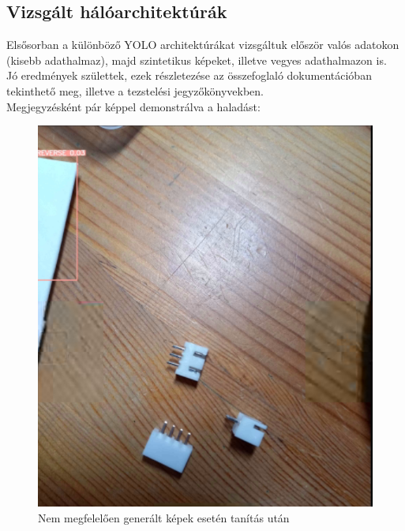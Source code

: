 \documentclass{article}
\begin{document}
\subsection{Vizsgált hálóarchitektúrák}
Elsősorban a különböző YOLO architektúrákat vizsgáltuk először valós adatokon (kisebb adathalmaz), 
majd szintetikus képeket, illetve vegyes adathalmazon is.\\
Jó eredmények születtek, ezek részletezése az összefoglaló dokumentációban 
tekinthető meg, illetve a tezstelési jegyzőkönyvekben.\\[5pt]
Megjegyzésként pár képpel demonstrálva a haladást:
\begin{figure}[h]
  \centering
  \includegraphics[scale=0.5]{rossz.png}
  \caption{Nem megfelelően generált képek esetén tanítás után}
\end{figure}
\end{document}
